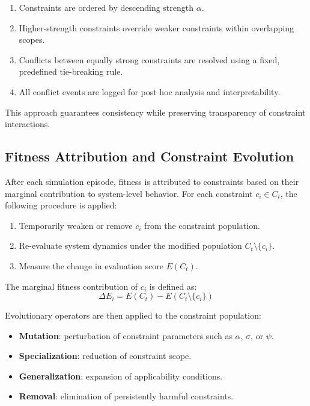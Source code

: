 \begin{enumerate}
    \item Constraints are ordered by descending strength $\alpha$.
    \item Higher-strength constraints override weaker constraints within overlapping scopes.
    \item Conflicts between equally strong constraints are resolved using a fixed, predefined tie-breaking rule.
    \item All conflict events are logged for post hoc analysis and interpretability.
\end{enumerate}

This approach guarantees consistency while preserving transparency of constraint interactions.

\subsection{Fitness Attribution and Constraint Evolution}

After each simulation episode, fitness is attributed to constraints based on their marginal contribution to system-level behavior. For each constraint $c_i \in C_t$, the following procedure is applied:

\begin{enumerate}
    \item Temporarily weaken or remove $c_i$ from the constraint population.
    \item Re-evaluate system dynamics under the modified population $C_t \setminus \{c_i\}$.
    \item Measure the change in evaluation score $E(C_t)$.
\end{enumerate}

The marginal fitness contribution of $c_i$ is defined as:
\[
\Delta E_i = E(C_t) - E(C_t \setminus \{c_i\})
\]

Evolutionary operators are then applied to the constraint population:
\begin{itemize}
    \item \textbf{Mutation}: perturbation of constraint parameters such as $\alpha$, $\sigma$, or $\psi$.
    \item \textbf{Specialization}: reduction of constraint scope.
    \item \textbf{Generalization}: expansion of applicability conditions.
    \item \textbf{Removal}: elimination of persistently harmful constraints.
\end{itemize}

